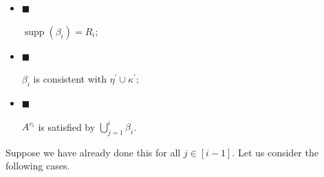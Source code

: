 \begin{itemize}


\item[] 
$\blacksquare$ 


$\operatorname*{supp}(\beta_{i})=R_{i}$;\par





\item[] 
$\blacksquare$ 


$\beta_{i}$ is consistent with $\eta^{\prime}\cup\kappa^{\prime}$;\par





\item[] 
$\blacksquare$ 


$A^{v_{i}}$ is satisfied by $\bigcup\limits_{j=1}^{i}\beta_{i}$.\par





\end{itemize}


Suppose we have already done this for all $j\in[i-1]$. Let us consider the following cases.\par


